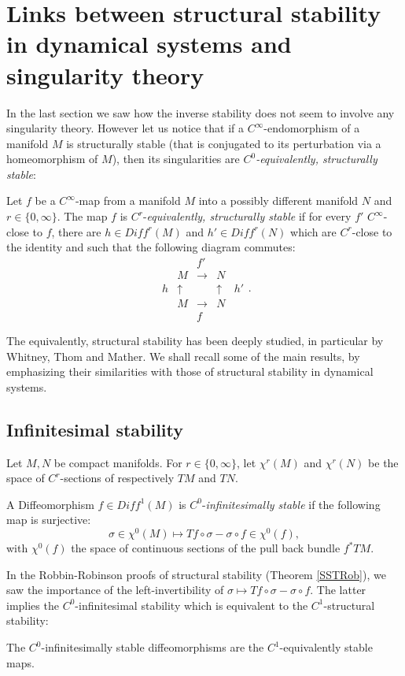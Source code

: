 \documentclass[11pt,openany,leqno]{article}
\begin{document}
\section{Links between structural stability in dynamical systems and  singularity theory}\label{sectionLinks}
In the last section we saw how the inverse stability does not seem to  involve any singularity theory. 
However let us notice that if a $C^\infty$-endomorphism of a manifold $M$ is structurally stable (that  is conjugated to its perturbation via a homeomorphism of $M$), then its singularities are \emph{$C^0$-equivalently, structurally stable}:
 \begin{defi}
 Let $f$ be a $C^\infty$-map from a manifold $M$ into a possibly different manifold $N$ and $r\in \{0,\infty\}$. The map $f$ is $C^r$-\emph{equivalently, structurally stable} if for every $f'$ $C^\infty$-close to $f$, there are  $h\in Diff^r(M)$ and $h'\in Diff^r(N)$ which are $C^r$-close to the identity and such that the following diagram commutes:
\[\begin{array}{lcccr} 
&&f'&&\\
 &M&\rightarrow &N&\\
 h&\uparrow &&\uparrow&h'\\
 &M&\rightarrow&N&\\
 &&f&&\end{array}.\]
\end{defi}

The equivalently, structural stability has been deeply studied, in particular by Whitney, Thom and Mather. We shall recall some of the main results, by emphasizing their similarities with those of structural stability in dynamical systems. 

 \subsection{Infinitesimal stability}
Let $M, N$ be compact manifolds.  For $r\in \{0,\infty\}$, let $\chi^r(M)$ and $\chi^r(N)$ be the space of $C^r$-sections of respectively $TM$ and $TN$.

 \begin{defi}
A Diffeomorphism  $f\in Diff^1(M)$ is $C^0$-\emph{infinitesimally stable} if the following map is surjective:
\[\sigma\in \chi^0(M)\mapsto Tf\circ \sigma- \sigma\circ f\in \chi^0(f),\]
with $\chi^0(f)$ the space of continuous sections of the pull back bundle  $f^*TM$. 
\end{defi} 
  In the Robbin-Robinson proofs of structural stability (Theorem \ref{SSTRob}), we saw the importance of the left-invertibility of $\sigma\mapsto Tf\circ \sigma- \sigma\circ f$. The latter implies the  $C^0$-{infinitesimal stability} which is equivalent to the $C^1$-structural stability:
\begin{thm}
The $C^0$-{infinitesimally stable} diffeomorphisms are the $C^1$-equivalently stable maps.
\end{thm}
\end{document}
